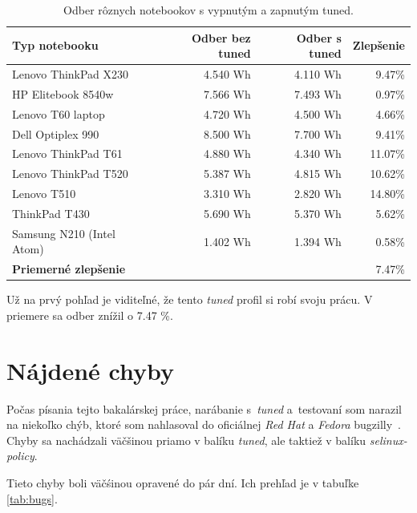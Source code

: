 \begin{table}[H]
\begin{center}
\begin{tabular}{|l|r|r|r|}
    \hline
    \textbf{Typ notebooku} & \textbf{Odber bez tuned} & \textbf{Odber s tuned} & \textbf{Zlepšenie} \\
    \hline
    Lenovo ThinkPad X230        & 4.540 Wh & 4.110 Wh & 9.47\% \\
    HP Elitebook 8540w          & 7.566 Wh & 7.493 Wh & 0.97\% \\
    Lenovo T60 laptop           & 4.720 Wh & 4.500 Wh & 4.66\% \\
    Dell Optiplex 990           & 8.500 Wh & 7.700 Wh & 9.41\% \\
    Lenovo ThinkPad T61         & 4.880 Wh & 4.340 Wh & 11.07\% \\
    Lenovo ThinkPad T520        & 5.387 Wh & 4.815 Wh & 10.62\% \\
    Lenovo T510                 & 3.310 Wh & 2.820 Wh & 14.80\% \\
    ThinkPad T430               & 5.690 Wh & 5.370 Wh & 5.62\% \\
    Samsung N210 (Intel Atom)   & 1.402 Wh & 1.394 Wh & 0.58\% \\
    \hline
    \textbf{Priemerné zlepšenie} & \multicolumn{3}{|r|}{7.47\%} \\
    \hline
\end{tabular}
\caption{Odber rôznych notebookov s vypnutým a zapnutým tuned.}
\label{tab:testday-results}
\end{center}
\end{table}

Už na prvý pohľad je viditeľné, že tento \emph{tuned} profil si robí svoju
prácu. V priemere sa odber znížil o 7.47 \%. 

%
%

\section{Nájdené chyby}

Počas písania tejto bakalárskej práce, narábanie s~\emph{tuned} a~testovaní som
narazil na niekoľko chýb, ktoré som nahlasoval do oficiálnej \emph{Red Hat} a
\emph{Fedora} bugzilly~\cite{rhBugzilla}. Chyby sa nachádzali väčšinou priamo v
balíku \emph{tuned}, ale taktiež v balíku \emph{selinux-policy}.

Tieto chyby boli väčśinou opravené do pár dní. Ich prehľad je v tabuľke \ref{tab:bugs}.

